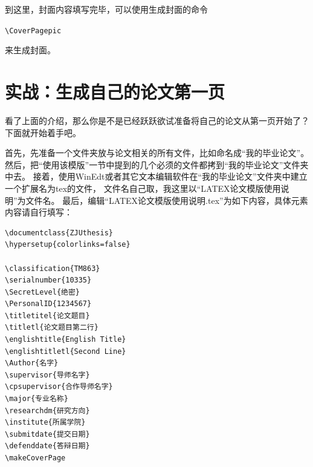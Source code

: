 \vspace{8pt}

到这里，封面内容填写完毕，可以使用生成封面的命令

{\noindent{}\verb+\CoverPagepic+}


来生成封面。

\section{实战：生成自己的论文第一页}

看了上面的介绍，那么你是不是已经跃跃欲试准备将自己的论文从第一页开始了？下面就开始着手吧。

首先，先准备一个文件夹放与论文相关的所有文件，比如命名成“我的毕业论文”。
然后，把“使用该模版”一节中提到的几个必须的文件都拷到“我的毕业论文”文件夹中去。
接着，使用WinEdt或者其它文本编辑软件在“我的毕业论文”文件夹中建立一个扩展名为tex的文件，
文件名自己取，我这里以“LATEX论文模版使用说明”为文件名。
最后，编辑“LATEX论文模版使用说明.tex”为如下内容，具体元素内容请自行填写：

\vspace{5mm}

{
\linespread{1}
\noindent{}
\begin{verbatim}
\documentclass{ZJUthesis}
\hypersetup{colorlinks=false}

\classification{TM863}
\serialnumber{10335}
\SecretLevel{绝密}
\PersonalID{1234567}
\titletitel{论文题目}
\titletl{论文题目第二行}
\englishtitle{English Title}
\englishtitletl{Second Line}
\Author{名字}
\supervisor{导师名字}
\cpsupervisor{合作导师名字}
\major{专业名称}
\researchdm{研究方向}
\institute{所属学院}
\submitdate{提交日期}
\defenddate{答辩日期}
\makeCoverPage

\end{verbatim}
}

